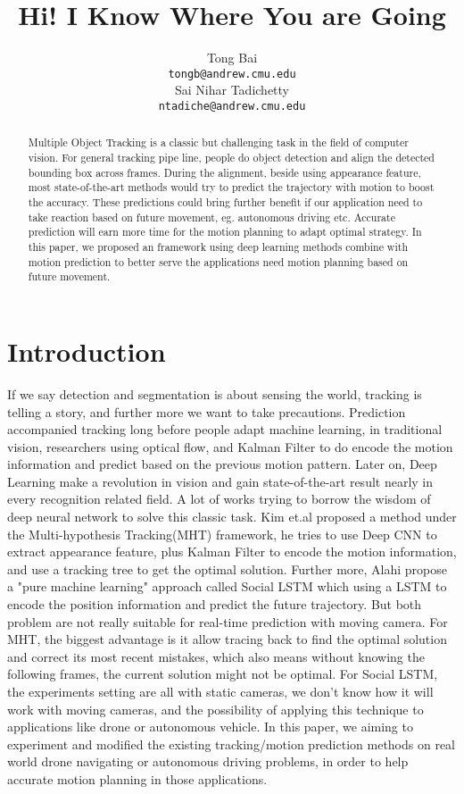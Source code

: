 \documentclass{article}
\title{Hi! I Know Where You are Going}
\author{
  Tong Bai\\
  \texttt{tongb@andrew.cmu.edu} \\
  \And
  Sai Nihar Tadichetty\\
  \texttt{ntadiche@andrew.cmu.edu} \\
}
\begin{document}

\maketitle

\begin{abstract}
  Multiple Object Tracking is a classic but challenging task in the field of computer vision. For general tracking pipe line, people do object detection and align the detected bounding box across frames. During the alignment, beside using appearance feature, most state-of-the-art methods would try to predict the trajectory with motion to boost the accuracy. These predictions could bring further benefit if our application need to take reaction based on future movement, eg. autonomous driving etc. Accurate prediction will earn more time for the motion planning to adapt optimal strategy. In this paper, we proposed an framework using deep learning methods combine with motion prediction to better serve the applications need motion planning based on future movement.
\end{abstract}

\section{Introduction}

If we say detection and segmentation is about sensing the world, tracking is telling a story, and further more we want to take precautions. Prediction accompanied tracking long before people adapt machine learning, in traditional vision, researchers using optical flow, and Kalman Filter to do encode the motion information and predict based on the previous motion pattern. Later on, Deep Learning make a revolution in vision and gain state-of-the-art result nearly in every recognition related field. A lot of works trying to borrow the wisdom of deep neural network to solve this classic task. Kim et.al \cite{kim2015multiple} proposed a method under the Multi-hypothesis Tracking(MHT) framework, he tries to use Deep CNN to extract appearance feature, plus Kalman Filter to encode the motion information, and use a tracking tree to get the optimal solution. Further more, Alahi propose a "pure machine learning" approach called Social LSTM \cite{Alahi_2016_CVPR} which using a LSTM to encode the position information and predict the future trajectory. But both problem are not really suitable for real-time prediction with moving camera. For MHT, the biggest advantage is it allow tracing back to find the optimal solution and correct its most recent mistakes, which also means without knowing the following frames, the current solution might not be optimal. For Social LSTM, the experiments setting are all with static cameras, we don't know how it will work with moving cameras, and the possibility of applying this technique to applications like drone or autonomous vehicle.  In this paper, we aiming to experiment and modified the existing tracking/motion prediction methods on real world drone navigating or autonomous driving problems, in order to help accurate motion planning in those applications.
\end{document}
